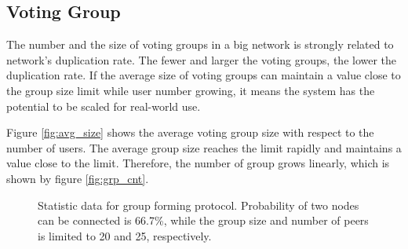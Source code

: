 \documentclass[twocolumn]{article}
\begin{document}
\subsection{Voting Group}
The number and the size of voting groups in a big network is strongly related to network's duplication rate. The fewer and larger the voting groups, the lower the duplication rate. If the average size of voting groups can maintain a value close to the group size limit while user number growing, it means the system has the potential to be scaled for real-world use.

Figure \ref{fig:avg_size} shows the average voting group size with respect to the number of users. The average group size reaches the limit rapidly and maintains a value close to the limit. Therefore, the number of group grows linearly, which is shown by figure \ref{fig:grp_cnt}.


\begin{figure}[t]
\centering
{}
\caption{Statistic data for group forming protocol. Probability of two nodes can be connected is 66.7\%, while the group size and number of peers is limited to 20 and 25, respectively.}
\label{fig:stat}
\end{figure}
\end{document}
